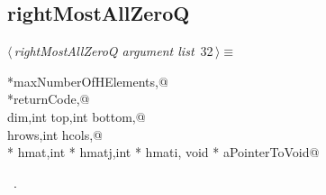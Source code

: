 \documentclass{article}
\begin{document}
\subsection{rightMostAllZeroQ}
\label{sec:rightMostAllZeroQ}
\begin{flushleft} \small
\begin{minipage}{\linewidth}\label{scrap37}\raggedright\small
{} $\langle\,${\itshape rightMostAllZeroQ argument list}\nobreak\ {\footnotesize {32}}$\,\rangle\equiv$
\vspace{-1ex}
\begin{list}{}{} \item
\mbox{}\verb@int *maxNumberOfHElements,@\\
\mbox{}\verb@int *returnCode,@\\
\mbox{}\verb@int dim,int top,int bottom,@\\
\mbox{}\verb@int hrows,int hcols,@\\
\mbox{}\verb@double * hmat,int * hmatj,int * hmati, void * aPointerToVoid@\\
\mbox{}\verb@@{\NWsep}
\end{list}
\vspace{-1.5ex}
\footnotesize
\begin{list}{}{\setlength{\itemsep}{-\parsep}\setlength{\itemindent}{-\leftmargin}}
\item \NWtxtMacroRefIn\ .

\end{list}
\end{minipage}
\end{flushleft}
\end{document}
